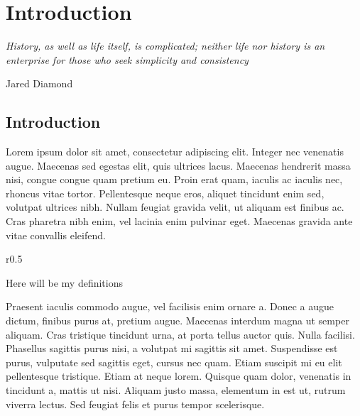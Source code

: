 \chapter{Introduction}
\epigraph{\emph{History, as well as life itself, is complicated; neither life nor history is an enterprise for those who seek simplicity and consistency}}{Jared Diamond}

\section{Introduction}
\label{C01_01}

Lorem ipsum dolor sit amet, consectetur adipiscing elit. Integer nec venenatis augue. Maecenas sed egestas elit, quis ultrices lacus. Maecenas hendrerit massa nisi, congue congue quam pretium eu. Proin erat quam, iaculis ac iaculis nec, rhoncus vitae tortor. Pellentesque neque eros, aliquet tincidunt enim sed, volutpat ultrices nibh. Nullam feugiat gravida velit, ut aliquam est finibus ac. Cras pharetra nibh enim, vel lacinia enim pulvinar eget. Maecenas gravida ante vitae convallis eleifend.

\begin{wrapfigure}{r}{0.5\textwidth}
  \vspace{-20pt}
  \begin{center}
        \begin{definitions}[Definitions]
        \label{C01_B01}
        Here will be my definitions
        \end{definitions}  
  \end{center}
  \vspace{-20pt}
\end{wrapfigure}

Praesent iaculis commodo augue, vel facilisis enim ornare a. Donec a augue dictum, finibus purus at, pretium augue. Maecenas interdum magna ut semper aliquam. Cras tristique tincidunt urna, at porta tellus auctor quis. Nulla facilisi. Phasellus sagittis purus nisi, a volutpat mi sagittis sit amet. Suspendisse est purus, vulputate sed sagittis eget, cursus nec quam. Etiam suscipit mi eu elit pellentesque tristique. Etiam at neque lorem. Quisque quam dolor, venenatis in tincidunt a, mattis ut nisi. Aliquam justo massa, elementum in est ut, rutrum viverra lectus. Sed feugiat felis et purus tempor scelerisque.

\clearpage
%

%  
